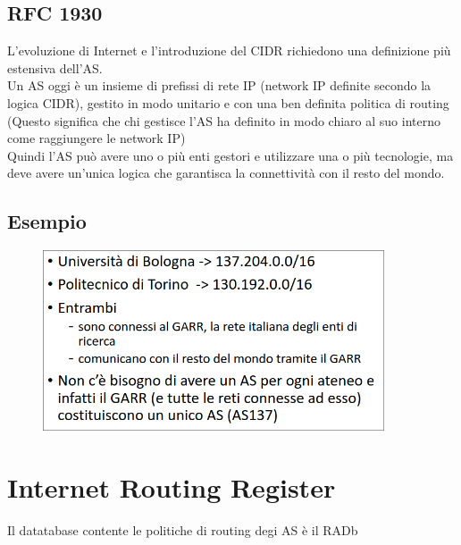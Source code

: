 \documentclass{report}
\begin{document}
            \subsection{RFC 1930}
                L'evoluzione di Internet e l'introduzione del CIDR richiedono una definizione più estensiva dell'AS.
                \\
                Un AS oggi è un insieme di prefissi di rete IP (network IP definite secondo la logica CIDR), gestito in modo unitario e con una ben definita politica di routing (Questo significa che chi gestisce l’AS ha definito in modo chiaro al suo interno come raggiungere le network IP)
                \\
                Quindi l'AS può avere uno o più enti gestori e utilizzare una o più tecnologie, ma deve avere un'unica logica che garantisca la connettività con il resto del mondo.
            \subsection{Esempio}
                \begin{figure}[H]
                    \includegraphics[width=0.9\textwidth]{3/esempioUnibo.png}
                \end{figure}
        \section{Internet Routing Register}
            Il datatabase contente le politiche di routing degi AS è il RADb
\end{document}
